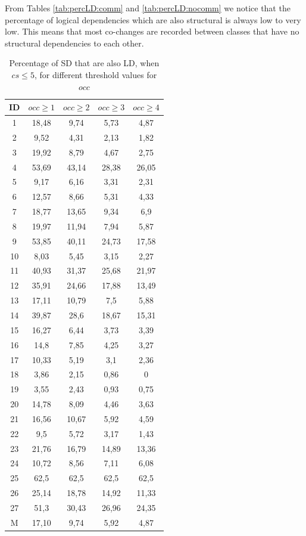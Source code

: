 \documentclass[a4paper,twoside]{article}
\begin{document}
From Tables \ref{tab:percLD:comm} and \ref{tab:percLD:nocomm} we notice that the percentage of logical dependencies which are also structural is always low to very low. This means that most co-changes are recorded between classes that have no structural dependencies to each other.   
 
\begin{table}[!h]
\renewcommand{\arraystretch}{1.25}
\caption{Percentage of SD that are also LD,  when $cs \leq 5$, for different threshold values for $occ$}
\label{table:10}
\centering
\begin{tabular}{|c|c|c|c|c|}
\hline
    ID  & $occ\geq 1$ & $occ\geq 2$ & $occ\geq 3$ & $occ\geq 4$  \\
\hline
1	&	18,48	&	9,74	&	5,73	&	4,87	\\
2	&	9,52	&	4,31	&	2,13	&	1,82	\\
3	&	19,92	&	8,79	&	4,67	&	2,75	\\
4	&	53,69	&	43,14	&	28,38	&	26,05	\\
5	&	9,17	&	6,16	&	3,31	&	2,31	\\
6	&	12,57	&	8,66	&	5,31	&	4,33	\\
7	&	18,77	&	13,65	&	9,34	&	6,9	\\
8	&	19,97	&	11,94	&	7,94	&	5,87	\\
9	&	53,85	&	40,11	&	24,73	&	17,58	\\
10	&	8,03	&	5,45	&	3,15	&	2,27	\\
11	&	40,93	&	31,37	&	25,68	&	21,97	\\
12	&	35,91	&	24,66	&	17,88	&	13,49	\\
13	&	17,11	&	10,79	&	7,5	&	5,88	\\
14	&	39,87	&	28,6	&	18,67	&	15,31	\\
15	&	16,27	&	6,44	&	3,73	&	3,39	\\
16	&	14,8	&	7,85	&	4,25	&	3,27	\\
17	&	10,33	&	5,19	&	3,1	&	2,36	\\
18	&	3,86	&	2,15	&	0,86	&	0	\\
19	&	3,55	&	2,43	&	0,93	&	0,75	\\
20	&	14,78	&	8,09	&	4,46	&	3,63	\\
21	&	16,56	&	10,67	&	5,92	&	4,59	\\
22	&	9,5	&	5,72	&	3,17	&	1,43	\\
23	&	21,76	&	16,79	&	14,89	&	13,36	\\
24	&	10,72	&	8,56	&	7,11	&	6,08	\\
25	&	62,5	&	62,5	&	62,5	&	62,5	\\
26	&	25,14	&	18,78	&	14,92	&	11,33	\\
27	&	51,3	&	30,43	&	26,96	&	24,35	\\
\hline
M	&	17,10&	9,74	&	5,92	&	4,87	\\

\hline
\end{tabular}
\end{table}
\end{document}
